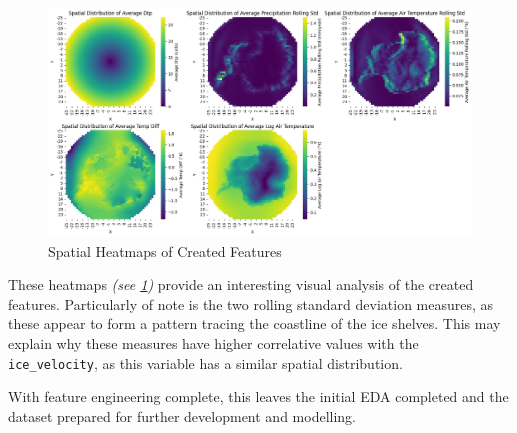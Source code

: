 \begin{figure}[H]
  \centering
  \includegraphics[width=1\textwidth]{images/feature_creation_heatmaps.png}
  \caption{Spatial Heatmaps of Created Features}
  \label{fig:created_feature_heatmaps}
\end{figure}

These heatmaps \textit{(see \ref{fig:created_feature_heatmaps})} provide an interesting visual analysis of the created features. Particularly of note is the two rolling standard deviation measures, as these appear to form a pattern tracing the coastline of the ice shelves. This may explain why these measures have higher correlative values with the \texttt{ice\_velocity}, as this variable has a similar spatial distribution.

With feature engineering complete, this leaves the initial EDA completed and the dataset prepared for further development and modelling.